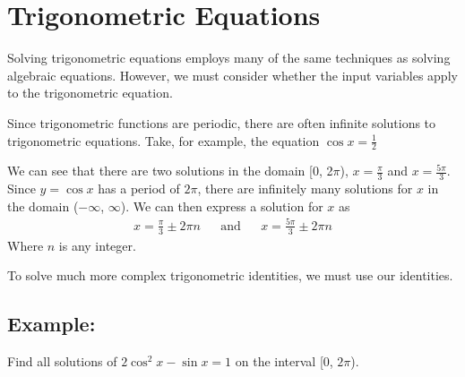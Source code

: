 \documentclass[11pt]{article}
\begin{document}
\section{Trigonometric Equations}
Solving trigonometric equations employs many of the same techniques as solving algebraic equations. However, we must consider whether the input variables apply to the trigonometric equation.

Since trigonometric functions are periodic, there are often infinite solutions to trigonometric equations. Take, for example, the equation $\cos x = \frac{1}{2}$

\begin{center}
\end{center}
We can see that there are two solutions in the domain [0, 2$\pi$), $x = \frac{\pi}{3}$ and $x = \frac{5\pi}{3}$. Since $y = \cos x$ has a period of $2\pi$, there are infinitely many solutions for $x$ in the domain ($-\infty$, $\infty$). We can then express a solution for $x$ as 
\begin{align*}
    x = \frac{\pi}{3} \pm 2\pi n & & \text{and} & & x = \frac{5\pi}{3} \pm 2\pi n
\end{align*}
Where $n$ is any integer.

To solve much more complex trigonometric identities, we must use our identities.

\subsection*{Example:}

Find all solutions of $2\cos^2{x} - \sin{x} = 1$ on the interval [0, $2\pi$).
\end{document}

